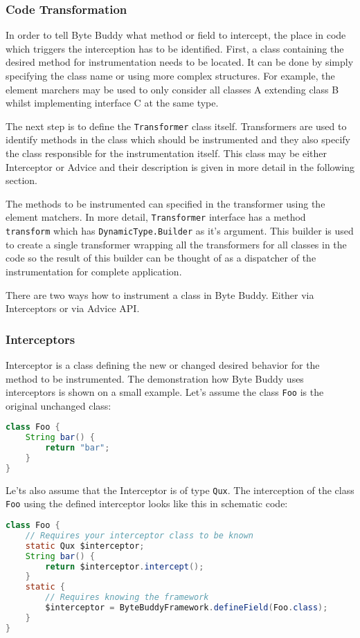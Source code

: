 \subsubsection{Code Transformation}
In order to tell Byte Buddy what method or field to intercept, the place in code which triggers the interception has to be identified. First,  a class containing the desired method for instrumentation needs to be located. It can be done by simply specifying the class name or using more complex structures. For example, the element marchers may be used to only consider all classes A extending class B whilst implementing interface C at the same type. 

The next step is to define the \texttt{Transformer} class itself. Transformers are used to identify methods in the class which should be instrumented and they also specify the class responsible for the instrumentation itself. This class may be either Interceptor or Advice and their description is given in more detail in the following section. 

The methods to be instrumented can specified in the transformer using the element matchers. In more detail, \texttt{Transformer} interface has a method \texttt{ transform} which has \texttt{DynamicType.Builder} as it's argument. This builder is used to create a single transformer wrapping all the transformers for all classes in the code so the result of this builder can be thought of as a dispatcher of the instrumentation for complete application.

There are two ways how to instrument a class in Byte Buddy. Either via Interceptors or via Advice API.
\subsubsection{Interceptors}
Interceptor is a class defining the new or changed desired behavior for the method to be instrumented. 
The demonstration how Byte Buddy uses interceptors is shown on a small example. Let's assume the class \texttt{Foo} is the original unchanged class:
\begin{lstlisting}[language=Java]
class Foo {
	String bar() {
		return "bar"; 
	}
}
\end{lstlisting}
	
Le'ts also assume that the Interceptor is of type \texttt{Qux}. The interception of the class \texttt{Foo} using the defined interceptor looks like this in schematic code:

\begin{lstlisting}[language=Java]
class Foo {
	// Requires your interceptor class to be known
	static Qux $interceptor;
	String bar() {
		return $interceptor.intercept(); 
	}
	static {
		// Requires knowing the framework
		$interceptor = ByteBuddyFramework.defineField(Foo.class);
	}
}
\end{lstlisting}
		
